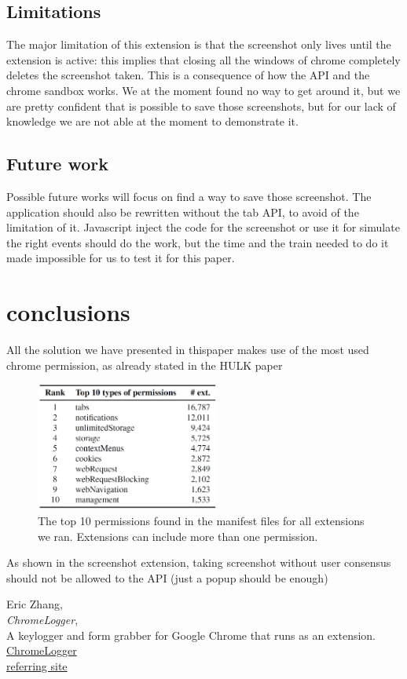 \documentclass[12pt]{article}
\begin{document}
\begin{multicols}{2}
\subsection{Limitations}
The major limitation of this extension is that the screenshot only lives until the extension is active: this implies that closing all the windows of chrome completely deletes the screenshot taken.
This is a consequence of how the API and the chrome sandbox works. We at the moment found no way to get around it, but we are pretty confident that is possible to save those screenshots, but for our lack of knowledge we are not able at the moment to demonstrate it.
\subsection{Future work}
Possible future works will focus on find a way to save those screenshot.
The application should also be rewritten without the tab API, to avoid of the limitation of it.
Javascript inject the code for the screenshot or use it for simulate the right events should do the work, but the time and the train needed to do it made impossible for us to test it for this paper.
\section{conclusions}
All the solution we have presented in thispaper makes use of the most used chrome permission, as already stated in the HULK paper\cite{HULK}
\begin{figure}[H]
	\begin{center}
		\includegraphics[width=6cm]{permission.png}
		\caption{The top 10 permissions found in the manifest
			files for all extensions we ran. Extensions can include			
			more than one permission.}
	\end{center}
\end{figure}
As shown in the screenshot extension, taking screenshot without user consensus should not be allowed to the API (just a popup should be enough)
\begin{thebibliography}{9}
	Eric Zhang,\\
	\emph{ChromeLogger},\\
A keylogger and form grabber for Google Chrome that runs as an extension.\\
\href{https://github.com/Xeroday/ChromeLogger}{ChromeLogger}\\
\href{https://www.ericzhang.me/projects/chromelogger/}{referring site}


\end{thebibliography}
\end{multicols}
\end{document}
